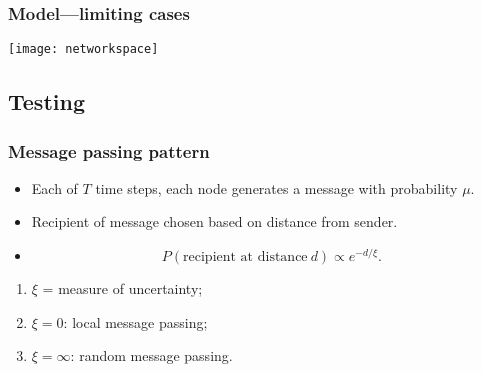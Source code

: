 
\begin{frame}
  \frametitle{Model---limiting cases}

  \vfill
  \begin{center}
    \texttt{[image: networkspace]}
  \end{center}
  \vfill
\end{frame}




\subsection{Testing}

\begin{frame}
  \frametitle{Message passing pattern}

  \begin{itemize}
  \item<1->
    Each of $T$ time steps,  each node generates a message with probability $\mu$.
  \item<2-> 
    Recipient of message chosen based on distance from sender.
  \item<3-> 
    $$
    P(\mbox{recipient at distance}\ d) \propto e^{-d/\xi}.
    $$
  \end{itemize}
  \begin{enumerate}
  \item<3-> 
    $\xi$ = measure of uncertainty;
  \item<3-> 
    $\xi=0$: local message passing;
  \item<3->  
    $\xi=\infty$: random message passing.
  \end{enumerate}
\end{frame}

